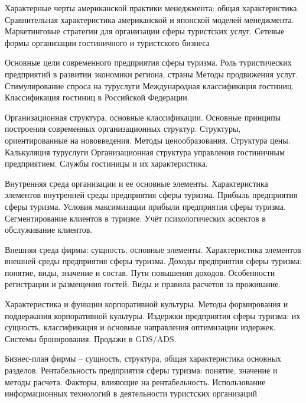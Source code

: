 \documentclass[
	11pt,
	a4paper,
	]
	{article}
\begin{document}
\bigskip

\noindent{} 
	{
		Характерные черты американской практики менеджмента: общая характеристика. Сравнительная характеристика американской и японской моделей менеджмента.
	}{
		Маркетинговые стратегии для организации сферы туристских услуг.
	}{
		Сетевые формы организации гостиничного и туристского бизнеса
	}

\bigskip

\noindent{} 
	{
		Основные цели современного предприятия сферы туризма. Роль туристических предприятий в развитии экономики региона, страны
	}{
		Методы продвижения услуг. Стимулирование спроса на туруслуги
	}{
		Международная классификация гостиниц. Классификация гостиниц в Российской Федерации.
	}

\bigskip

\noindent{} 
	{
		Организационная структура, основные классификации. Основные принципы построения современных организационных структур. Структуры, ориентированные на нововведения.
	}{
		Методы ценообразования. Структура цены. Калькуляция туруслуги
	}{
		Организационная структура управления гостиничным предприятием. Службы гостиницы и их характеристика.
	}

\bigskip

\noindent{} 
	{
		Внутренняя среда организации и ее основные элементы. Характеристика элементов внутренней среды предприятия сферы туризма.
	}{
		Прибыль предприятия сферы туризма. Условия максимизации прибыли предприятия сферы туризма.
	}{
		Сегментирование клиентов в туризме. Учёт психологических аспектов в обслуживание клиентов.
	}

\bigskip

\noindent{} 
	{
		Внешняя среда фирмы: сущность, основные элементы. Характеристика элементов внешней среды предприятия сферы туризма.
	}{
		Доходы предприятия сферы туризма: понятие, виды, значение и состав. Пути повышения доходов.
	}{
		Особенности регистрации и размещения гостей. Виды и правила расчетов за проживание.
	}

\bigskip

\noindent{} 
	{
		Характеристика и функции корпоративной культуры. Методы формирования и поддержания корпоративной культуры.
	}{
		Издержки предприятия сферы туризма: их сущность, классификация и основные направления оптимизации издержек.
	}{
		Системы бронирования. Продажи в GDS/ADS.
	}

\bigskip

\noindent{} 
	{
		Бизнес-план фирмы – сущность, структура, общая характеристика основных разделов.
	}{
		Рентабельность предприятия сферы туризма: понятие, значение и методы расчета. Факторы, влияющие на рентабельность.
	}{
		Использование информационных технологий в деятельности туристских организаций
	}
\end{document}
